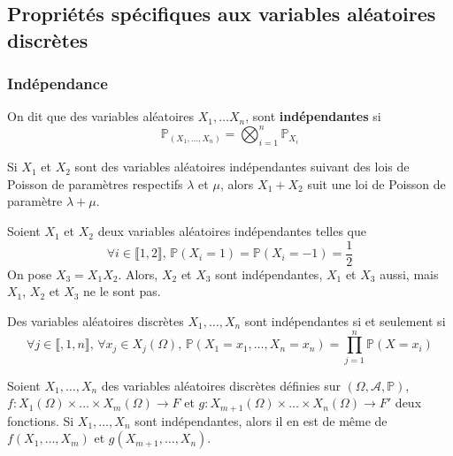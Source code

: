 	\subsection{Propriétés spécifiques aux variables aléatoires discrètes}

	\subsubsection{Indépendance}


	\begin{definition}
		On dit que des variables aléatoires $X_1, \dots X_n$, sont \textbf{indépendantes} si
		\[ \mathbb{P}_{(X_1, \dots, X_n)} = \bigotimes_{i=1}^n \mathbb{P}_{X_i} \]
	\end{definition}


	\begin{example}
		Si $X_1$ et $X_2$ sont des variables aléatoires indépendantes suivant des lois de Poisson de paramètres respectifs $\lambda$ et $\mu$, alors $X_1 + X_2$ suit une loi de Poisson de paramètre $\lambda + \mu$.
	\end{example}

	\begin{cexample}
		Soient $X_1$ et $X_2$ deux variables aléatoires indépendantes telles que
		\[ \forall i \in \llbracket 1, 2 \rrbracket, \, \mathbb{P}(X_i = 1) = \mathbb{P}(X_i = -1) = \frac{1}{2} \]
		On pose $X_3 = X_1 X_2$. Alors, $X_2$ et $X_3$ sont indépendantes, $X_1$ et $X_3$ aussi, mais $X_1$, $X_2$ et $X_3$ ne le sont pas.
	\end{cexample}


	\begin{proposition}
		Des variables aléatoires discrètes $X_1, \dots, X_n$ sont indépendantes si et seulement si
		\[ \forall j \in \llbracket, 1, n \rrbracket, \, \forall x_j \in X_j(\Omega), \, \mathbb{P}(X_1 = x_1, \dots, X_n = x_n) = \prod_{j = 1}^n \mathbb{P}(X = x_i) \]
	\end{proposition}

	\begin{proposition}
		Soient $X_1, \dots, X_n$ des variables aléatoires discrètes définies sur $(\Omega, \mathcal{A}, \mathbb{P})$, $f : X_1(\Omega) \times \dots \times X_m(\Omega) \rightarrow F$ et $g : X_{m+1}(\Omega) \times \dots \times X_n(\Omega) \rightarrow F'$ deux fonctions. Si $X_1, \dots, X_n$ sont indépendantes, alors il en est de même de $f(X_1, \dots, X_m)$ et $g(X_{m+1}, \dots, X_n)$.
	\end{proposition}

